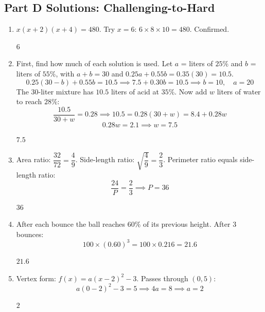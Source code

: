 \documentclass[14pt]{extarticle}
\begin{document}
\subsection*{Part D Solutions: Challenging-to-Hard}
\begin{enumerate}
  \item \(x(x+2)(x+4) = 480\). Try \(x = 6\): \(6 \times 8 \times 10 = 480\). Confirmed.

  \(\boxed{6}\)

  \item First, find how much of each solution is used. Let \(a\) = liters of \(25\%\) and \(b\) = liters of \(55\%\), with \(a + b = 30\) and \(0.25a + 0.55b = 0.35(30) = 10.5\).
  \[
  0.25(30 - b) + 0.55b = 10.5 \implies 7.5 + 0.30b = 10.5 \implies b = 10, \quad a = 20
  \]
  The 30-liter mixture has \(10.5\) liters of acid at \(35\%\). Now add \(w\) liters of water to reach \(28\%\):
  \[
  \frac{10.5}{30 + w} = 0.28 \implies 10.5 = 0.28(30 + w) = 8.4 + 0.28w
  \]
  \[
  0.28w = 2.1 \implies w = 7.5
  \]

  \(\boxed{7.5}\)

  \item Area ratio: \(\dfrac{32}{72} = \dfrac{4}{9}\). Side-length ratio: \(\sqrt{\dfrac{4}{9}} = \dfrac{2}{3}\). Perimeter ratio equals side-length ratio:
  \[
  \frac{24}{P} = \frac{2}{3} \implies P = 36
  \]

  \(\boxed{36}\)

  \item After each bounce the ball reaches \(60\%\) of its previous height. After 3 bounces:
  \[
  100 \times (0.60)^3 = 100 \times 0.216 = 21.6
  \]

  \(\boxed{21.6}\)

  \item Vertex form: \(f(x) = a(x - 2)^2 - 3\). Passes through \((0, 5)\):
  \[
  a(0 - 2)^2 - 3 = 5 \implies 4a = 8 \implies a = 2
  \]

  \(\boxed{2}\)
\end{enumerate}
\end{document}
